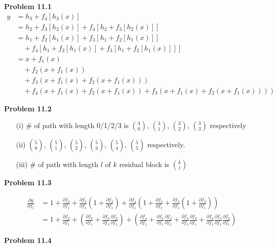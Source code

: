 \documentclass{article}
\begin{document}
\textbf{Problem 11.1}
\begin{align*}
y &= h_3 + f_4[h_3(x)] \\
&= h_2 + f_3[h_2(x)] + f_4[h_2 + f_3[h_2(x)]] \\
&= h_1 + f_2[h_1(x)] + f_3[h_1 + f_2[h_1(x)]] \\
&\quad + f_4[h_1 + f_2[h_1(x)] + f_3[h_1 + f_2[h_1(x)]]] \\
&= x + f_1(x) \\
&\quad + f_2(x + f_1(x)) \\
&\quad + f_3(x + f_1(x) + f_2(x + f_1(x))) \\
&\quad + f_4(x + f_1(x) + f_2(x + f_1(x)) + f_3(x + f_1(x) + f_2(x + f_1(x))))
\end{align*}

\textbf{Problem 11.2}
\begin{enumerate}
    \item[(i)] \# of path with length 0/1/2/3 is $\binom{3}{0}$, $\binom{3}{1}$, $\binom{3}{2}$, $\binom{3}{3}$ respectively
    
    \item[(ii)] $\binom{5}{0}$, $\binom{5}{1}$, $\binom{5}{2}$, $\binom{5}{3}$, $\binom{5}{4}$, $\binom{5}{5}$ respectively.
    
    \item[(iii)] \# of path with length $l$ of $k$ residual block is $\binom{k}{l}$
\end{enumerate}

\textbf{Problem 11.3}

\begin{align*}
\frac{\partial y}{\partial f_1} &= 1 + \frac{\partial f_2}{\partial f_1} + \frac{\partial f_3}{\partial f_1}\left(1 + \frac{\partial f_2}{\partial f_1}\right) + \frac{\partial f_4}{\partial f_1}\left(1 + \frac{\partial f_3}{\partial f_1} + \frac{\partial f_3}{\partial f_1}\left(1 + \frac{\partial f_2}{\partial f_1}\right)\right) \\
&= 1 + \frac{\partial f_2}{\partial f_1} + \left(\frac{\partial f_3}{\partial f_1} + \frac{\partial f_3}{\partial f_1}\frac{\partial f_2}{\partial f_1}\right) + \left(\frac{\partial f_4}{\partial f_1} + \frac{\partial f_4}{\partial f_1}\frac{\partial f_2}{\partial f_1} + \frac{\partial f_4}{\partial f_1}\frac{\partial f_3}{\partial f_1} + \frac{\partial f_4}{\partial f_1}\frac{\partial f_3}{\partial f_1}\frac{\partial f_2}{\partial f_1}\right)
\end{align*}

\textbf{Problem 11.4}
\end{document}
